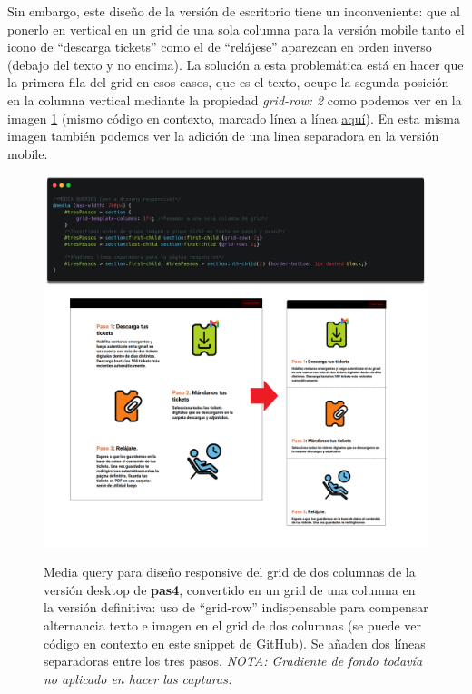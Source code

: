 \documentclass[a4paper,12pt]{report}
\begin{document}
	Sin embargo, este diseño de la versión de escritorio tiene un inconveniente: que al ponerlo en vertical en un grid de una sola columna para la versión mobile tanto el icono de ``descarga tickets'' como el de ``relájese'' aparezcan en orden inverso (debajo del texto y no encima). La solución a esta problemática está en hacer que la primera fila del grid en esos casos, que es el texto, ocupe la segunda posición en la columna vertical mediante la propiedad \textit{grid-row: 2} como podemos ver en la imagen \ref{fig:pas4grid1col} (mismo código en contexto, marcado línea a línea \href{https://github.com/blackcub3s/mercApp/blob/75141ebaa42e677993ba88e1dfe73d417ef6386c/APP%20WEB/__frontend__produccio__/app/css/pas4/estilsEspecificsPas4.css#L57-L65}{aquí}). En esta misma imagen también podemos ver la adición de una línea separadora en la versión mobile.
	
	\FloatBarrier
	\setlength{\belowcaptionskip}{3pt}
	\begin{figure}[H]
		\centering
		\caption{Media query para diseño responsive del grid de dos columnas de la versión desktop de \textbf{pas4}, convertido en un grid de una columna en la versión definitiva: uso de ``grid-row'' indispensable para compensar alternancia texto e imagen en el grid de dos columnas (se puede ver código en contexto en este snippet de GitHub). Se añaden dos líneas separadoras entre los tres pasos. \textit{NOTA: Gradiente de fondo todavía no aplicado en hacer las capturas.}}
		\includegraphics[width=1\linewidth]{img/pas4grid1col}
		\label{fig:pas4grid1col}
	\end{figure}
	\FloatBarrier
	
\end{document}
